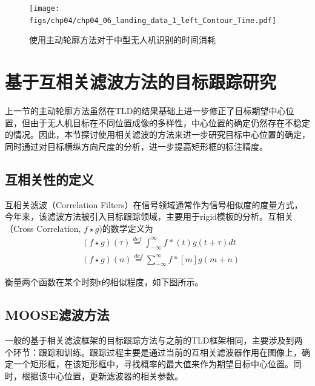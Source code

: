 \begin{figure}[ht]   
	\centering
	\texttt{[image: figs/chp04/chp04\_06\_landing\_data\_1\_left\_Contour\_Time.pdf]}
	\caption{使用主动轮廓方法对于中型无人机识别的时间消耗}
	\label{fig:chp04_06_landing_data_1_left_Contour_Time}
\end{figure}


\section{基于互相关滤波方法的目标跟踪研究}
上一节的主动轮廓方法虽然在TLD的结果基础上进一步修正了目标期望中心位置，但由于无人机目标在不同位置成像的多样性，中心位置的确定仍然存在不稳定的情况。因此，本节探讨使用相关滤波的方法来进一步研究目标中心位置的确定，同时通过对目标横纵方向尺度的分析，进一步提高矩形框的标注精度。


\subsection{互相关性的定义}
互相关滤波（Correlation Filters）在信号领域通常作为信号相似度的度量方式，今年来，该滤波方法被引入目标跟踪领域，主要用于rigid模板的分析。互相关（Cross Correlation, $f \star g$)的数学定义为
\begin{align}
&(f \star g)(\tau )\mathop  = \limits^{def} \int_{ - \infty }^\infty  {f*(t)g(t + \tau )dt} \\ 
&(f \star g)(n)\mathop  = \limits^{def} \sum\limits_{ - \infty }^\infty  {f*[m]g(m + n)}
\end{align}

衡量两个函数在某个时刻τ的相似程度，如下图所示。

\subsection{MOOSE滤波方法}
一般的基于相关滤波框架的目标跟踪方法与之前的TLD框架相同，主要涉及到两个环节：跟踪和训练。跟踪过程主要是通过当前的互相关滤波器作用在图像上，确定一个矩形框，在该矩形框中，寻找概率的最大值来作为期望目标中心位置。同时，根据该中心位置，更新滤波器的相关参数。

